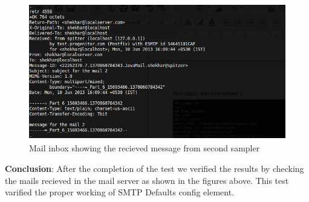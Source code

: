 \documentclass[12pt]{book}
\begin{document}
  \begin{figure}[H]
   \centering
   \includegraphics[width=15cm, height=6cm]{images/smtpdefaults_88}
   \caption{Mail inbox showing the recieved message from second sampler\label{fig:fig35_JMeter}}
  \end{figure}
  
  \textbf{Conclusion}:
  After the completion of the test we verified the results by checking the mails recieved in the mail server as shown in the figures above.
  This test varified the proper working of SMTP Defaults config element.
  
\end{document}
